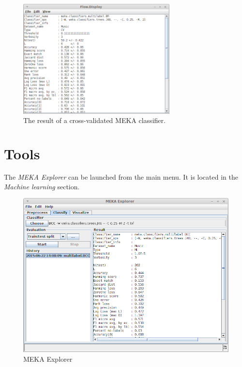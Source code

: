 \documentclass[a4paper]{book}
\begin{document}
\begin{figure}[htb]
  \centering
  \includegraphics[width=8.0cm]{images/crossvalidate-output.png}
  \caption{The result of a cross-validated MEKA classifier.}
  \label{crossvalidate-output}
\end{figure}

\chapter{Tools}
The \textit{MEKA Explorer} can be launched from the main menu. It is located
in the \textit{Machine learning} section.

\begin{figure}[htb]
  \centering
  \includegraphics[width=12.0cm]{images/explorer.png}
  \caption{MEKA Explorer}
  \label{explorer}
\end{figure}



\end{document}
